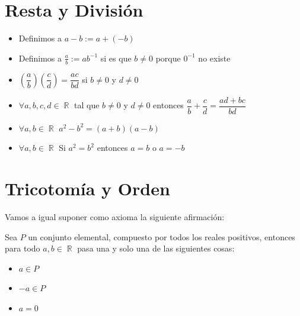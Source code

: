 \documentclass[12pt, fleqn]{report}                             %
\theoremstyle{break}                                            %
\DeclareMathOperator \Reals        {\mathbb{R}}                 %
\newcommand{\Wrap}[1]           {\left( #1 \right)}             %
\newcommand{\pfrac}[2]      {\Wrap{\dfrac{#1}{#2}}}             %
\begin{document}
        \section{Resta y División}

            \begin{itemize}
                \item 
                    Definimos a $a - b := a + (-b)$
                \item
                    Definimos a $\frac{a}{b} := ab^{-1}$ si es que $b \neq 0$
                    porque $0^{-1}$ no existe
            \end{itemize}

            \begin{itemize}
                \item $\pfrac{a}{b} \pfrac{c}{d} = \dfrac{ac}{bd}$ si $b \neq 0$ y $d \neq 0$
                    
                \item $\forall a, b, c, d \in \Reals$ tal que $b \neq 0$ y $d \neq 0$ entonces
                        $\dfrac{a}{b} + \dfrac{c}{d} = \dfrac{ad+bc}{bd}$        

                \item $\forall a, b \in \Reals$ $a^2-b^2 = (a+b)(a-b)$

                \item $\forall a, b \in \Reals$ Si $a^2 = b^2$ entonces $a=b$ o $a=-b$

            \end{itemize}


        \clearpage
        \section{Tricotomía y Orden}

            Vamos a igual suponer como axioma la siguiente afirmación:

            Sea $P$ un conjunto elemental, compuesto por todos los reales positivos, entonces 
            para todo $a, b \in \Reals$ pasa una y solo una de las siguientes cosas:

            \begin{itemize}
                \item $a \in P$
                \item $-a \in P$
                \item $a = 0$
            \end{itemize}
\end{document}
